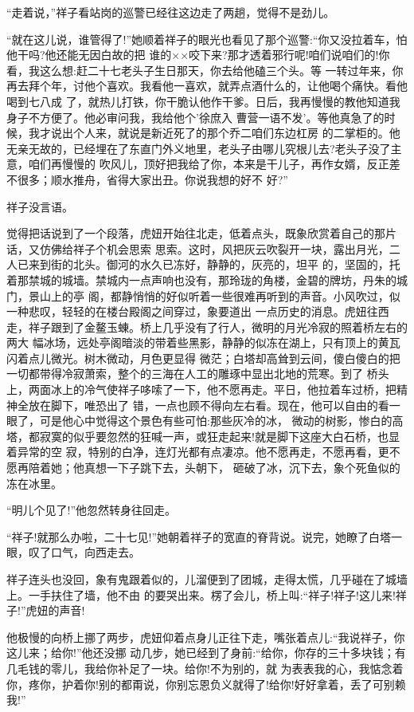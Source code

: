 \documentclass[11pt,a4paper,onecolumn]{article}
\begin{document}
``走着说，''祥子看站岗的巡警已经往这边走了两趟，觉得不是劲儿。

``就在这儿说，谁管得了!''她顺着祥子的眼光也看见了那个巡警:``你又没拉着车，怕他干吗?他还能无因白故的把
谁的××咬下来?那才透着邪行呢!咱们说咱们的!你看，我这么想:赶二十七老头子生日那天，你去给他磕三个头。等
一转过年来，你再去拜个年，讨他个喜欢。我看他一喜欢，就弄点酒什么的，让他喝个痛快。看他喝到七八成
了，就热儿打铁，你干脆认他作干爹。日后，我再慢慢的教他知道我身子不方便了。他必审问我，我给他个'徐庶入
曹营\myrule 一语不发'。等他真急了的时候，我才说出个人来，就说是新近死了的那个乔二\myrule 咱们东边杠房
的二掌柜的。他无亲无故的，已经埋在了东直门外义地里，老头子由哪儿究根儿去?老头子没了主意，咱们再慢慢的
吹风儿，顶好把我给了你，本来是干儿子，再作女婿，反正差不很多；顺水推舟，省得大家出丑。你说我想的好不
好?''

祥子没言语。

觉得把话说到了一个段落，虎妞开始往北走，低着点头，既象欣赏着自己的那片话，又仿佛给祥子个机会思索
思索。这时，风把灰云吹裂开一块，露出月光，二人已来到街的北头。御河的水久已冻好，静静的，灰亮的，坦平
的，坚固的，托着那禁城的城墙。禁城内一点声响也没有，那玲珑的角楼，金碧的牌坊，丹朱的城门，景山上的亭
阁，都静悄悄的好似听着一些很难再听到的声音。小风吹过，似一种悲叹，轻轻的在楼台殿阁之间穿过，象要道出
一点历史的消息。虎妞往西走，祥子跟到了金鳌玉蝀。桥上几乎没有了行人，微明的月光冷寂的照着桥左右的两大
幅冰场，远处亭阁暗淡的带着些黑影，静静的似冻在湖上，只有顶上的黄瓦闪着点儿微光。树木微动，月色更显得
微茫；白塔却高耸到云间，傻白傻白的把一切都带得冷寂萧索，整个的三海在人工的雕琢中显出北地的荒寒。到了
桥头上，两面冰上的冷气使祥子哆嗦了一下，他不愿再走。平日，他拉着车过桥，把精神全放在脚下，唯恐出了
错，一点也顾不得向左右看。现在，他可以自由的看一眼了，可是他心中觉得这个景色有些可怕:那些灰冷的冰，
微动的树影，惨白的高塔，都寂寞的似乎要忽然的狂喊一声，或狂走起来!就是脚下这座大白石桥，也显着异常的空
寂，特别的白净，连灯光都有点凄凉。他不愿再走，不愿再看，更不愿再陪着她；他真想一下子跳下去，头朝下，
砸破了冰，沉下去，象个死鱼似的冻在冰里。

``明儿个见了!''他忽然转身往回走。

``祥子!就那么办啦，二十七见!''她朝着祥子的宽直的脊背说。说完，她瞭了白塔一眼，叹了口气，向西走去。

祥子连头也没回，象有鬼跟着似的，儿溜便到了团城，走得太慌，几乎碰在了城墙上。一手扶住了墙，他不由
的要哭出来。楞了会儿，桥上叫:``祥子!祥子!这儿来!祥子!''虎妞的声音!

他极慢的向桥上挪了两步，虎妞仰着点身儿正往下走，嘴张着点儿:``我说祥子，你这儿来；给你!''他还没挪
动几步，她已经到了身前:``给你，你存的三十多块钱；有几毛钱的零儿，我给你补足了一块。给你!不为别的，就
为表表我的心，我惦念着你，疼你，护着你!别的都甭说，你别忘恩负义就得了!给你!好好拿着，丢了可别赖我!''
\end{document}
